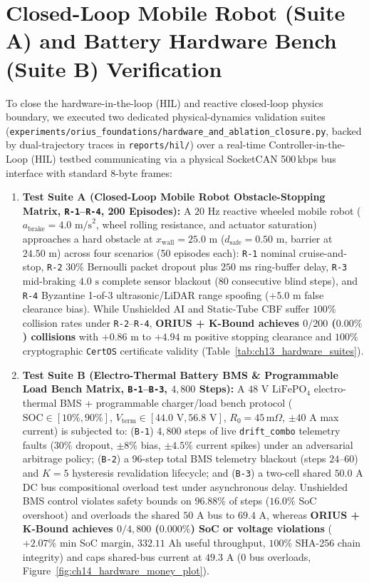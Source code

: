 \section{Closed-Loop Mobile Robot (Suite A) and Battery Hardware Bench (Suite B) Verification}
To close the hardware-in-the-loop (HIL) and reactive closed-loop physics boundary, we executed two dedicated physical-dynamics validation suites (\texttt{experiments/\allowbreak orius\_\allowbreak foundations/\allowbreak hardware\_\allowbreak and\_\allowbreak ablation\_\allowbreak closure.py}, backed by dual-trajectory traces in \texttt{reports/hil/}) over a real-time Controller-in-the-Loop (HIL) testbed communicating via a physical SocketCAN 500\,kbps bus interface with standard 8-byte frames:
\begin{enumerate}
    \item \textbf{Test Suite A (Closed-Loop Mobile Robot Obstacle-Stopping Matrix, \texttt{R-1}--\texttt{R-4}, 200 Episodes):} A $20\text{ Hz}$ reactive wheeled mobile robot ($a_{\mathrm{brake}} = 4.0\text{ m/s}^2$, wheel rolling resistance, and actuator saturation) approaches a hard obstacle at $x_{\mathrm{wall}} = 25.0\text{ m}$ ($d_{\mathrm{safe}} = 0.50\text{ m}$, barrier at $24.50\text{ m}$) across four scenarios (50 episodes each): \texttt{R-1} nominal cruise-and-stop, \texttt{R-2} $30\%$ Bernoulli packet dropout plus $250\text{ ms}$ ring-buffer delay, \texttt{R-3} mid-braking $4.0\text{ s}$ complete sensor blackout (80 consecutive blind steps), and \texttt{R-4} Byzantine 1-of-3 ultrasonic/LiDAR range spoofing ($+5.0\text{ m}$ false clearance bias). While Unshielded AI and Static-Tube CBF suffer $100\%$ collision rates under \texttt{R-2}--\texttt{R-4}, \textbf{ORIUS + K-Bound achieves $0 / 200$ ($0.00\%$) collisions} with $+0.86\text{ m}$ to $+4.94\text{ m}$ positive stopping clearance and $100\%$ cryptographic \texttt{CertOS} certificate validity (Table~\ref{tab:ch13_hardware_suites}).
    \item \textbf{Test Suite B (Electro-Thermal Battery BMS \& Programmable Load Bench Matrix, \texttt{B-1}--\texttt{B-3}, $4,800$ Steps):} A $48\text{ V}$ $\text{LiFePO}_4$ electro-thermal BMS + programmable charger/load bench protocol ($\mathrm{SOC} \in [10\%, 90\%]$, $V_{\mathrm{term}} \in [44.0\text{ V}, 56.8\text{ V}]$, $R_0 = 45\,\text{m}\Omega$, $\pm 40\text{ A}$ max current) is subjected to: (\texttt{B-1}) $4,800$ steps of live \texttt{drift\_combo} telemetry faults ($30\%$ dropout, $\pm 8\%$ bias, $\pm 4.5\%$ current spikes) under an adversarial arbitrage policy; (\texttt{B-2}) a 96-step total BMS telemetry blackout (steps $24\text{--}60$) and $K=5$ hysteresis revalidation lifecycle; and (\texttt{B-3}) a two-cell shared $50.0\text{ A}$ DC bus compositional overload test under asynchronous delay. Unshielded BMS control violates safety bounds on $96.88\%$ of steps ($16.0\%$ SoC overshoot) and overloads the shared $50\text{ A}$ bus to $69.4\text{ A}$, whereas \textbf{ORIUS + K-Bound achieves $0 / 4,800$ ($0.000\%$) SoC or voltage violations} ($+2.07\%$ min SoC margin, $332.11\text{ Ah}$ useful throughput, $100\%$ SHA-256 chain integrity) and caps shared-bus current at $49.3\text{ A}$ ($0$ bus overloads, Figure~\ref{fig:ch14_hardware_money_plot}).
\end{enumerate}

